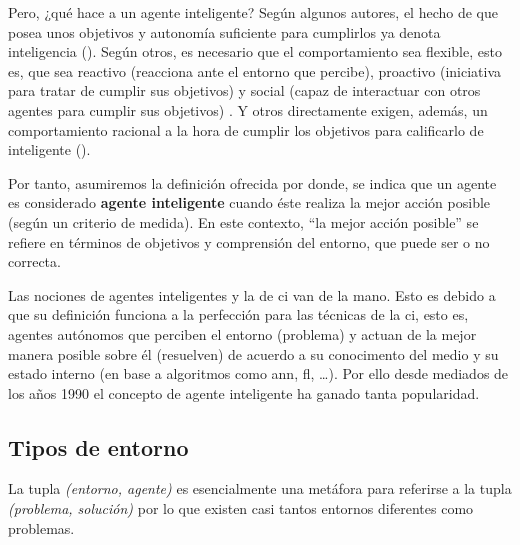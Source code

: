 Pero, ¿qué hace a un agente inteligente? Según algunos autores, el hecho de que posea unos objetivos y autonomía suficiente para cumplirlos ya denota inteligencia (). Según otros, es necesario que el comportamiento sea flexible, esto es, que sea reactivo (reacciona ante el entorno que percibe), proactivo (iniciativa para tratar de cumplir sus objetivos) y social (capaz de interactuar con otros agentes para cumplir sus objetivos) \cite{Wooldridge1995}. Y otros directamente exigen, además, un comportamiento racional a la hora de cumplir los objetivos para calificarlo de inteligente ().

Por tanto, asumiremos la definición ofrecida por \cite{russell2003artificial} donde, se indica que un agente es considerado \textbf{agente inteligente} cuando éste realiza la mejor acción posible (según un criterio de medida). En este contexto, \enquote{la mejor acción posible} se refiere en términos de objetivos y comprensión del entorno, que puede ser o no correcta.

Las nociones de agentes inteligentes y la de \ac{ci} van de la mano. Esto es debido a que su definición funciona a la perfección para las técnicas de la \ac{ci}, esto es, agentes autónomos que perciben el entorno (problema) y actuan de la mejor manera posible sobre él (resuelven) de acuerdo a su conocimento del medio y su estado interno (en base a algoritmos como \ac{ann}, \ac{fl}, \ldots). Por ello desde mediados de los años 1990 el concepto de agente inteligente ha ganado tanta popularidad.

\subsection{Tipos de entorno}

La tupla \textit{(entorno, agente)} es esencialmente una metáfora para referirse a la tupla \textit{(problema, solución)} por lo que existen casi tantos entornos diferentes como problemas.

